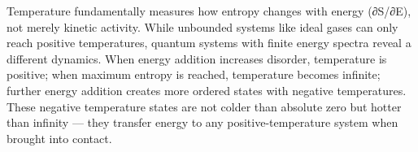 Temperature fundamentally measures how entropy changes with energy (∂S/∂E), not merely kinetic activity. While unbounded systems like ideal gases can only reach positive temperatures, quantum systems with finite energy spectra reveal a different dynamics. When energy addition increases disorder, temperature is positive; when maximum entropy is reached, temperature becomes infinite; further energy addition creates more ordered states with negative temperatures. These negative temperature states are not colder than absolute zero but hotter than infinity — they transfer energy to any positive-temperature system when brought into contact.
